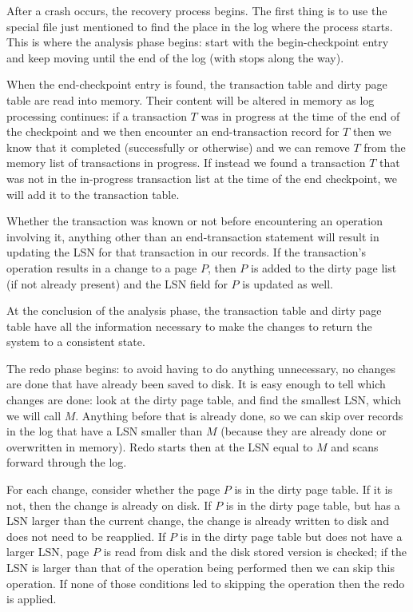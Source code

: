 \documentclass[a4paper]{report}
\begin{document}
After a crash occurs, the recovery process begins. The first thing is to use the special file just mentioned to find the place in the log where the process starts. This is where the analysis phase begins: start with the begin-checkpoint entry and keep moving until the end of the log (with stops along the way). 

When the end-checkpoint entry is found, the transaction table and dirty page table are read into memory. Their content will be altered in memory as log processing continues: if a transaction $T$ was in progress at the time of the end of the checkpoint and we then encounter an end-transaction record for $T$ then we know that it completed (successfully or otherwise) and we can remove $T$ from the memory list of transactions in progress. If instead we found a transaction $T$ that was not in the in-progress transaction list at the time of the end checkpoint, we will add it to the transaction table. 

Whether the transaction was known or not before encountering an operation involving it, anything other than an end-transaction statement will result in updating the LSN for that transaction in our records. If the transaction's operation results in a change to a page $P$, then $P$ is added to the dirty page list (if not already present) and the LSN field for $P$ is updated as well. 

At the conclusion of the analysis phase, the transaction table and dirty page table have all the information necessary to make the changes to return the system to a consistent state.

The redo phase begins: to avoid having to do anything unnecessary, no changes are done that have already been saved to disk. It is easy enough to tell which changes are done: look at the dirty page table, and find the smallest LSN, which we will call $M$. Anything before that is already done, so we can skip over records in the log that have a LSN smaller than $M$ (because they are already done or overwritten in memory). Redo starts then at the LSN equal to $M$ and scans forward through the log. 

For each change, consider whether the page $P$ is in the dirty page table. If it is not, then the change is already on disk. If $P$ is in the dirty page table, but has a LSN larger than the current change, the change is already written to disk and does not need to be reapplied. If $P$ is in the dirty page table but does not have a larger LSN, page $P$ is read from disk and the disk stored version is checked; if the LSN is larger than that of the operation being performed then we can skip this operation.  If none of those conditions led to skipping the operation then the redo is applied. 
\end{document}
